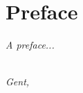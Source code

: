 \chapter*{Preface}

\emph{A preface...}

\begin{flushright}
{\makeatletter\itshape
    \@author \\
    Gent, \monthname{} \the\year{}
\makeatother}
\end{flushright}
